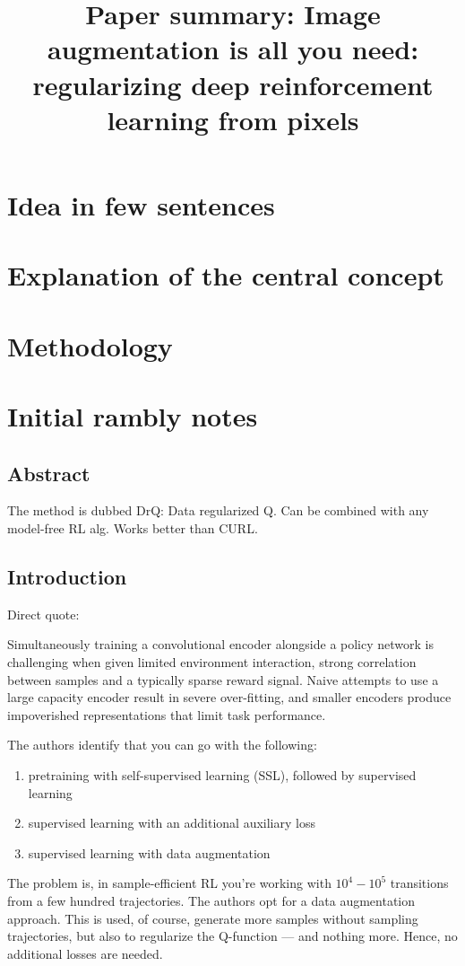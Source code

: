 \documentclass{article}
\title{Paper summary: Image augmentation is all you need: 
regularizing deep reinforcement learning from pixels}
\begin{document}
\maketitle


\section{Idea in few sentences}



\section{Explanation of the central concept}


\section{Methodology}


\section{Initial rambly notes}


\subsection{Abstract}
The method is dubbed DrQ: Data regularized Q.
Can be combined with any model-free RL alg.
Works better than CURL.

\subsection{Introduction}
Direct quote:
\begin{displayquote}
Simultaneously training a convolutional encoder alongside a policy network is challenging when given
limited environment interaction, strong correlation between samples
and a typically sparse reward signal.
Naive attempts to use a large capacity encoder result in severe over-fitting,
and smaller encoders produce impoverished representations that limit task performance.
\end{displayquote}
The authors identify that you can go with the following:
\begin{enumerate}
		\item pretraining with self-supervised learning (SSL), followed by supervised learning
		\item supervised learning with an additional auxiliary loss
		\item supervised learning with data augmentation
\end{enumerate}
The problem is, in sample-efficient RL you're working with $ 10^{ 4 } - 10^{ 5 }  $ transitions
from a few hundred trajectories.
The authors opt for a data augmentation approach.
This is used, of course, generate more samples without sampling trajectories, but
also to regularize the Q-function --- and nothing more. Hence,
no additional losses are needed.
\end{document}
